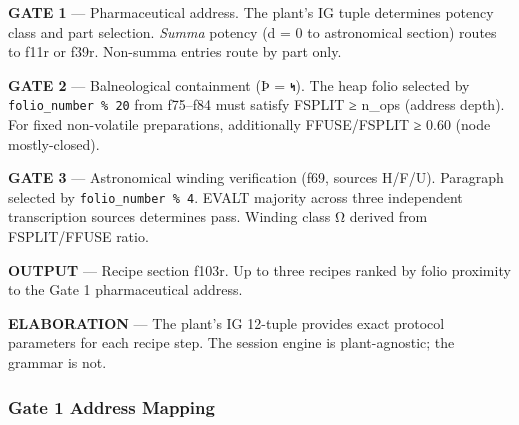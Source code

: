 \documentclass[12pt,a4paper]{article}
\begin{document}
\textbf{GATE 1} --- Pharmaceutical address. The plant's IG tuple
determines potency class and part selection. \emph{Summa} potency (d = 0
to astronomical section) routes to f11r or f39r. Non-summa entries route
by part only.

\textbf{GATE 2} --- Balneological containment (Þ = 𐑰). The heap folio
selected by \texttt{folio\_number\ \%\ 20} from f75--f84 must satisfy
FSPLIT ≥ n\_ops (address depth). For fixed non-volatile preparations,
additionally FFUSE/FSPLIT ≥ 0.60 (node mostly-closed).

\textbf{GATE 3} --- Astronomical winding verification (f69, sources
H/F/U). Paragraph selected by \texttt{folio\_number\ \%\ 4}. EVALT
majority across three independent transcription sources determines pass.
Winding class Ω derived from FSPLIT/FFUSE ratio.

\textbf{OUTPUT} --- Recipe section f103r. Up to three recipes ranked by
folio proximity to the Gate 1 pharmaceutical address.

\textbf{ELABORATION} --- The plant's IG 12-tuple provides exact protocol
parameters for each recipe step. The session engine is plant-agnostic;
the grammar is not.

\hypertarget{gate-1-address-mapping}{%
\subsubsection{Gate 1 Address Mapping}\label{gate-1-address-mapping}}
\end{document}
